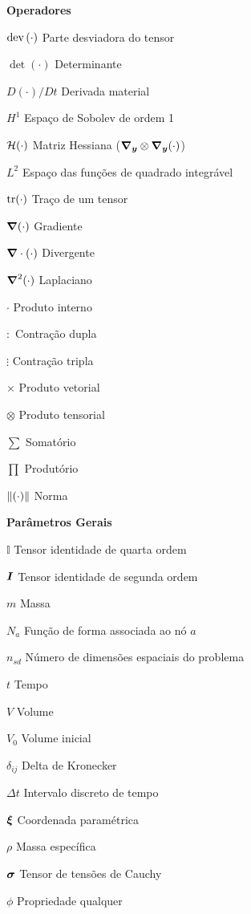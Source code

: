 \begin{simbolos}
    \item[\textbf{Operadores}]
    \item[$\mathop{\mathrm{dev}}\nolimits{(}\cdot)$] Parte desviadora do tensor
    \item[$\det{(\cdot)}$] Determinante
    \item[$D(\cdot)/Dt$] Derivada material
    \item[$H^1$] Espaço de Sobolev de ordem 1
    \item[$\mathcal{H}(\cdot)$] Matriz Hessiana ($\boldsymbol{\nabla_y}\otimes\boldsymbol{\nabla_y}(\cdot)$)
    \item[$L^2$] Espaço das funções de quadrado integrável
    \item[$\mathop{\mathrm{tr}}\nolimits(\cdot)$] Traço de um tensor
    \item[$\boldsymbol{\nabla}(\cdot)$] Gradiente
    \item[$\boldsymbol{\nabla}\cdot(\cdot)$] Divergente
    \item[$\boldsymbol{\nabla}^2(\cdot)$] Laplaciano
    \item[$\cdot$] Produto interno
    \item[$:$] Contração dupla
    \item[$\vdots$] Contração tripla
    \item[$\times$] Produto vetorial
    \item[$\otimes$] Produto tensorial
    \item[$\sum$] Somatório
    \item[$\prod$] Produtório
    \item[$\left\lVert{(\cdot)}\right\lVert$] Norma

    \item[\textbf{Parâmetros Gerais}]
    \item[$\mathbb{I}$] Tensor identidade de quarta ordem
    \item[$\boldsymbol{I}$] Tensor identidade de segunda ordem
    \item[$m$] Massa
    \item[$N_a$] Função de forma associada ao nó $a$
    \item[$n_{sd}$] Número de dimensões espaciais do problema
    \item[$t$] Tempo
    \item[$V$] Volume
    \item[$V_0$] Volume inicial
    \item[$\delta_{ij}$] Delta de Kronecker
    \item[$\Delta t$] Intervalo discreto de tempo
    \item[$\boldsymbol{\xi}$] Coordenada paramétrica
    \item[$\rho$] Massa específica
    \item[$\boldsymbol{\sigma}$] Tensor de tensões de Cauchy
    \item[$\phi$] Propriedade qualquer


\end{simbolos}
